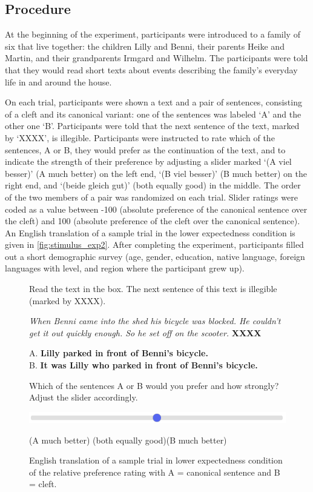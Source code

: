 \documentclass{salt}
\begin{document}
\subsection{Procedure}

At the beginning of the experiment, participants were introduced to a family of six that live together: the children Lilly and Benni, their parents Heike and Martin, and their grandparents Irmgard and Wilhelm. The participants were told that they would read short texts about events describing the family's everyday life in and around the house.

On each trial, participants were shown a text and a pair of sentences, consisting of a cleft and its canonical variant: one of the sentences was labeled `A' and the other one `B'. Participants were told that the next sentence of the text, marked by `XXXX', is illegible. Participants were instructed to rate which of the sentences, A or B, they would prefer as the continuation of the text, and to indicate the strength of their preference by adjusting a slider marked `(A viel besser)' (A much better) on the left end, `(B viel besser)' (B much better)  on the right end, and `(beide gleich gut)' (both equally good) in the middle. The order of the two members of a pair was randomized on each trial. Slider ratings were coded as a value between -100 (absolute preference of the canonical sentence over the cleft) and 100 (absolute preference of the cleft over the canonical sentence). An English translation of a sample trial in the lower expectedness condition is given in \autoref{fig:stimulus_exp2}. After completing the experiment, participants filled out a short demographic survey (age, gender, education, native language, foreign languages with level, and region where the participant grew up).

\begin{figure}[]
\caption{\small English translation of a sample trial in lower expectedness condition of the relative preference rating with A = canonical sentence and B = cleft.}
\footnotesize Read the text in the box. The next sentence of this text is illegible (marked by XXXX).
\begin{tcolorbox}
\textit{When Benni came into the shed his bicycle was blocked. He couldn't get it out quickly enough. So he set off on the scooter.} \textbf{XXXX}
\end{tcolorbox}\vspace{1ex}
A. \textbf{Lilly parked in front of Benni's bicycle.}\\
B. \textbf{It was Lilly who parked in front of Benni's bicycle.}\vspace{1ex}

Which of the sentences A or B would you prefer and how strongly? Adjust the slider accordingly.

\includegraphics[width=\textwidth]{slider.png}

(A much better)\hspace{21ex} (both equally good)\hfill (B much better)\normalsize
\label{fig:stimulus_exp2}
\end{figure}
\end{document}
